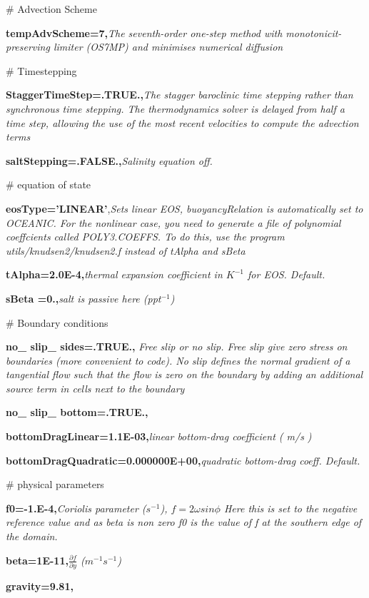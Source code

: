 {\# Advection Scheme

\textbf{tempAdvScheme=7,}\textit{The seventh-order one-step method with monotonicit-preserving limiter (OS7MP) \citep{Daru2004} and minimises numerical diffusion \citep{Ilıcak2012,shakespeare2012}}

\# Timestepping

\textbf{StaggerTimeStep=.TRUE.,}\textit{The stagger baroclinic time stepping rather than synchronous time stepping. The thermodynamics solver is delayed from half a time step, allowing the use of the most recent velocities to compute the advection terms}

\textbf{saltStepping=.FALSE.,}\textit{Salinity equation off.}

\# equation of state

\textbf{eosType='LINEAR'},\textit{Sets linear EOS, buoyancyRelation is automatically set to OCEANIC. For the nonlinear case, you need to generate a ﬁle of polynomial coeffcients called
POLY3.COEFFS. To do this, use the program utils/knudsen2/knudsen2.f instead of tAlpha and sBeta}

\textbf{tAlpha=2.0E-4,}\textit{thermal expansion coefficient in $K^{-1}$ for EOS. Default.}

\textbf{sBeta =0.,}\textit{salt is passive here (ppt$^{-1}$)}
 
\# Boundary conditions

\textbf{no\_ slip\_ sides=.TRUE.,} \textit{Free slip or no slip. Free slip give zero stress on boundaries (more convenient to code). No slip defines the normal gradient of a tangential flow such that the flow is zero on the boundary by adding an additional source term in cells next to the boundary}

\textbf{no\_ slip\_ bottom=.TRUE.,}

\textbf{bottomDragLinear=1.1E-03,}\textit{linear bottom-drag coefficient ( m/s )}

\textbf{ bottomDragQuadratic=0.000000E+00,}\textit{quadratic bottom-drag coeff. Default.}

\# physical parameters

\textbf{f0=-1.E-4,}\textit{Coriolis parameter ($s^{-1}$), $\displaystyle f=2\omega sin \phi$ Here this is set to the negative reference value and as beta is non zero f0 is the value of f at the southern edge of the domain.}

\textbf{beta=1E-11,}\textit{$\displaystyle \frac{\partial f}{\partial y}$ ($m^{-1}s^{-1}$)}

\textbf{gravity=9.81,}

}
